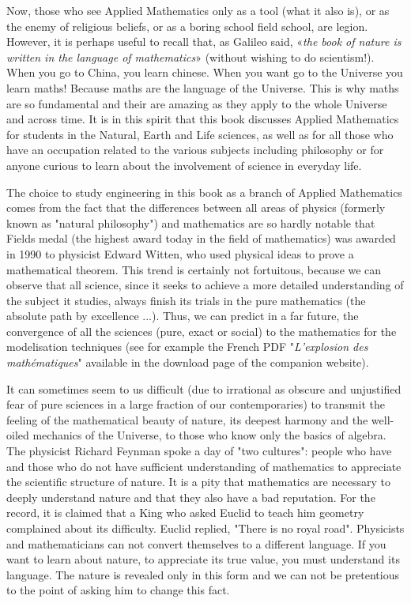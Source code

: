 	Now, those who see Applied Mathematics only as a tool (what it also is), or as the enemy of religious beliefs, or as a boring school field school, are legion. However, it is perhaps useful to recall that, as Galileo said, «\textit{the book of nature is written in the language of mathematics}» (without wishing to do scientism!). When you go to China, you learn chinese. When you want go to the Universe you learn maths! Because maths are the language of the Universe. This is why maths are so fundamental and their are amazing as they apply to the whole Universe and across time. It is in this spirit that this book discusses Applied Mathematics for students in the Natural, Earth and Life sciences, as well as for all those who have an occupation related to the various subjects including philosophy or for anyone curious to learn about the involvement of science in everyday life.

	The choice to study engineering in this book as a branch of Applied Mathematics comes from the fact that the differences between all areas of physics (formerly known as "natural philosophy") and mathematics are so hardly notable that Fields medal (the highest award today in the field of mathematics) was awarded in 1990 to physicist Edward Witten, who used physical ideas to prove a mathematical theorem. This trend is certainly not fortuitous, because we can observe that all science, since it seeks to achieve a more detailed understanding of the subject it studies, always finish its trials in the pure mathematics (the absolute path by excellence ...). Thus, we can predict in a far future, the convergence of all the sciences (pure, exact or social) to the mathematics for the modelisation techniques (see for example the French PDF "\textit{L'explosion des mathématiques}" available in the download page of the companion website).

	It can sometimes seem to us difficult (due to irrational as obscure and unjustified fear of pure sciences in a large fraction of our contemporaries) to transmit the feeling of the mathematical beauty of nature, its deepest harmony and the well-oiled mechanics of the Universe, to those who know only the basics of algebra. The physicist Richard Feynman spoke a day of "two cultures": people who have and those who do not have sufficient understanding of mathematics to appreciate the scientific structure of nature. It is a pity that mathematics are necessary to deeply understand nature and that they also have a bad reputation. For the record, it is claimed that a King who asked Euclid to teach him geometry complained about its difficulty. Euclid replied, "There is no royal road". Physicists and mathematicians can not convert themselves to a different language. If you want to learn about nature, to appreciate its true value, you must understand its language. The nature is revealed only in this form and we can not be pretentious to the point of asking him to change this fact.

